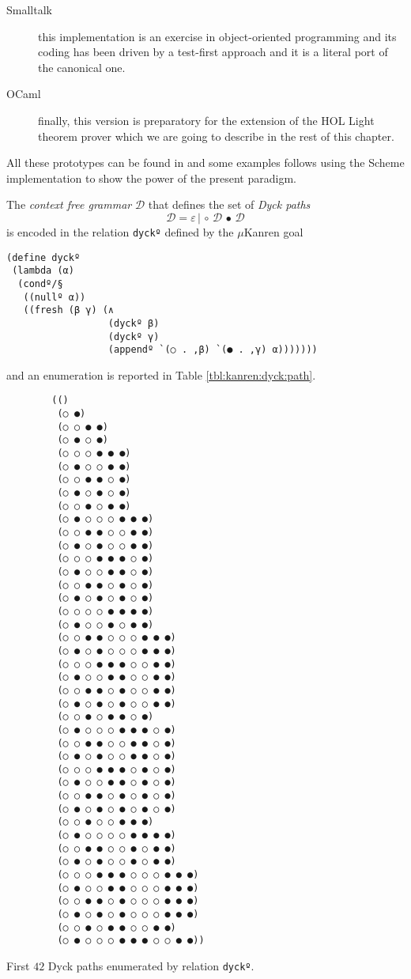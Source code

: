 \begin{description}
\item[Smalltalk] this implementation is an exercise in object-oriented
programming and its coding has been driven by a test-first approach
\citep{beck:TDD} and it is a literal port of the canonical one.

\item[OCaml] finally, this version is preparatory for the extension of the HOL
Light theorem prover which we are going to describe in the rest of this
chapter.

\end{description}

All these prototypes can be found in \citep{Nocentini:kanrens} and some
examples follows using the Scheme implementation to show the power of the
present paradigm.

\begin{example} The \textit{context free grammar} $\mathcal{D}$
that defines the set of \textit{Dyck paths}
\begin{displaymath}
\mathcal{D} = \varepsilon\,|\,\circ\,\mathcal{D}\,\bullet\,\mathcal{D}
\end{displaymath}
is encoded in the relation \verb|dyckº| defined by the $\mu$Kanren goal
\begin{verbatim}
(define dyckº
 (lambda (α)
  (condº/§
   ((nullº α))
   ((fresh (β γ) (∧
                  (dyckº β)
                  (dyckº γ)
                  (appendº `(○ . ,β) `(● . ,γ) α)))))))
\end{verbatim}
and an enumeration is reported in Table \ref{tbl:kanren:dyck:path}.
\begin{margintable}
\begin{verbatim}
        (()
         (○ ●)
         (○ ○ ● ●)
         (○ ● ○ ●)
         (○ ○ ○ ● ● ●)
         (○ ● ○ ○ ● ●)
         (○ ○ ● ● ○ ●)
         (○ ● ○ ● ○ ●)
         (○ ○ ● ○ ● ●)
         (○ ● ○ ○ ○ ● ● ●)
         (○ ○ ● ● ○ ○ ● ●)
         (○ ● ○ ● ○ ○ ● ●)
         (○ ○ ○ ● ● ● ○ ●)
         (○ ● ○ ○ ● ● ○ ●)
         (○ ○ ● ● ○ ● ○ ●)
         (○ ● ○ ● ○ ● ○ ●)
         (○ ○ ○ ○ ● ● ● ●)
         (○ ● ○ ○ ● ○ ● ●)
         (○ ○ ● ● ○ ○ ○ ● ● ●)
         (○ ● ○ ● ○ ○ ○ ● ● ●)
         (○ ○ ○ ● ● ● ○ ○ ● ●)
         (○ ● ○ ○ ● ● ○ ○ ● ●)
         (○ ○ ● ● ○ ● ○ ○ ● ●)
         (○ ● ○ ● ○ ● ○ ○ ● ●)
         (○ ○ ● ○ ● ● ○ ●)
         (○ ● ○ ○ ○ ● ● ● ○ ●)
         (○ ○ ● ● ○ ○ ● ● ○ ●)
         (○ ● ○ ● ○ ○ ● ● ○ ●)
         (○ ○ ○ ● ● ● ○ ● ○ ●)
         (○ ● ○ ○ ● ● ○ ● ○ ●)
         (○ ○ ● ● ○ ● ○ ● ○ ●)
         (○ ● ○ ● ○ ● ○ ● ○ ●)
         (○ ○ ● ○ ○ ● ● ●)
         (○ ● ○ ○ ○ ○ ● ● ● ●)
         (○ ○ ● ● ○ ○ ● ○ ● ●)
         (○ ● ○ ● ○ ○ ● ○ ● ●)
         (○ ○ ○ ● ● ● ○ ○ ○ ● ● ●)
         (○ ● ○ ○ ● ● ○ ○ ○ ● ● ●)
         (○ ○ ● ● ○ ● ○ ○ ○ ● ● ●)
         (○ ● ○ ● ○ ● ○ ○ ○ ● ● ●)
         (○ ○ ● ○ ● ● ○ ○ ● ●)
         (○ ● ○ ○ ○ ● ● ● ○ ○ ● ●))
\end{verbatim}
\caption{First $42$ Dyck paths enumerated by relation \texttt{dyckº}.}
\label{tbl:kanren:dyck:path}
\end{margintable}
\end{example}

